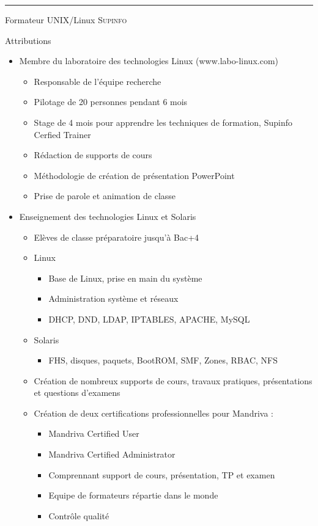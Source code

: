 \documentclass[a4paper,10pt]{article}
\begin{document}
\bigskip
\hrule
\bigskip
\newpage

\par{\centering\Large \hypertarget{supinfo}{Formateur UNIX/Linux \textsc{Supinfo}}\par}\large{\centering Attributions\par}\normalsize

\begin{itemize}
	\item Membre du laboratoire des technologies Linux (www.labo-linux.com)
	\begin{itemize}
		\item  Responsable de l’équipe recherche
		\item  Pilotage de 20 personnes pendant 6 mois
		\item  Stage de 4 mois pour apprendre les techniques de formation, Supinfo Cerfied Trainer
		\item  Rédaction de supports de cours
		\item  Méthodologie de création de présentation PowerPoint
		\item  Prise de parole et animation de classe
	\end{itemize}
	\item Enseignement des technologies Linux et Solaris
	\begin{itemize}
		\item  Elèves de classe préparatoire jusqu’à Bac+4
		\item  Linux
		\begin{itemize}
			\item  Base de Linux, prise en main du système
			\item  Administration système et réseaux
			\item  DHCP, DND, LDAP, IPTABLES, APACHE, MySQL
		\end{itemize}
		\item  Solaris
		\begin{itemize}
			\item  FHS, disques, paquets, BootROM, SMF, Zones, RBAC, NFS
		\end{itemize}
		\item  Création de nombreux supports de cours, travaux pratiques, présentations et questions d’examens
	\end{itemize}
	\begin{itemize}
		\item Création de deux certifications professionnelles pour Mandriva : 
		\begin{itemize}
			\item Mandriva Certified User
			\item Mandriva Certified Administrator
			\item Comprennant support de cours, présentation, TP et examen
			\item Equipe de formateurs répartie dans le monde
			\item Contrôle qualité
		\end{itemize}
		\end{itemize}
\end{itemize}
\end{document}
